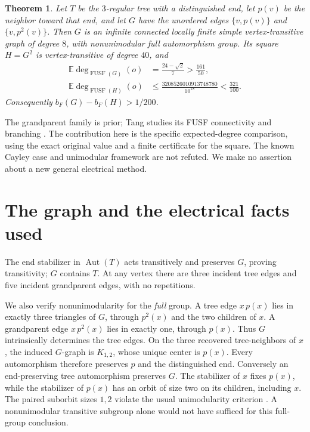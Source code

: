 \documentclass[11pt]{article}
\newtheorem{theorem}{Theorem}
\theoremstyle{remark}\newtheorem{remark}[theorem]{Remark}
\newcommand{\FUSF}{\operatorname{FUSF}}
\newcommand{\E}{\mathbb E}
\begin{document}
\begin{samepage}
\begin{theorem}\label{main}
Let \(T\) be the \(3\)-regular tree with a distinguished end, let \(p(v)\)
be the neighbor toward that end, and let \(G\) have the unordered edges
\(\{v,p(v)\}\) and \(\{v,p^2(v)\}\).
Then \(G\) is an infinite connected locally finite simple vertex-transitive
graph of degree \(8\), with nonunimodular full automorphism group.
Its square \(H=G^2\) is vertex-transitive of degree \(40\), and
\begin{align}
 \E\deg_{\FUSF(G)}(o)&=\frac{24-\sqrt2}{7}>\frac{161}{50},\label{gvalue}\\
 \E\deg_{\FUSF(H)}(o)&\le
 \frac{3208526010913748780}{10^{18}}<\frac{321}{100}.\label{hbound}
\end{align}
Consequently \(b_F(G)-b_F(H)>1/200\).
\end{theorem}
\end{samepage}

The grandparent family is prior; Tang studies its FUSF connectivity and
branching \cite[\S5.2]{Tang}. The contribution here is the specific
expected-degree comparison, using the exact original value and a finite
certificate for the square. The known Cayley case and unimodular
framework are not refuted. We make no assertion about a new general
electrical method.

\section{The graph and the electrical facts used}
The end stabilizer in \(\operatorname{Aut}(T)\) acts transitively and
preserves \(G\), proving transitivity; \(G\) contains \(T\).
At any vertex there are three incident tree edges and five incident
grandparent edges, with no repetitions.

We also verify nonunimodularity for the \emph{full} group.
A tree edge \(x\,p(x)\) lies in exactly three triangles of \(G\), through
\(p^2(x)\) and the two children of \(x\).
A grandparent edge \(x\,p^2(x)\) lies in exactly one, through \(p(x)\).
Thus \(G\) intrinsically determines the tree edges.
On the three recovered tree-neighbors of \(x\), the induced \(G\)-graph
is \(K_{1,2}\), whose unique center is \(p(x)\).
Every automorphism therefore preserves \(p\) and the distinguished end.
Conversely an end-preserving tree automorphism preserves \(G\).
The stabilizer of \(x\) fixes \(p(x)\), while the stabilizer of \(p(x)\)
has an orbit of size two on its children, including \(x\).
The paired suborbit sizes \(1,2\) violate the usual unimodularity
criterion \cite[\S2.3]{Tang}. A nonunimodular transitive subgroup alone
would not have sufficed for this full-group conclusion.
\end{document}
